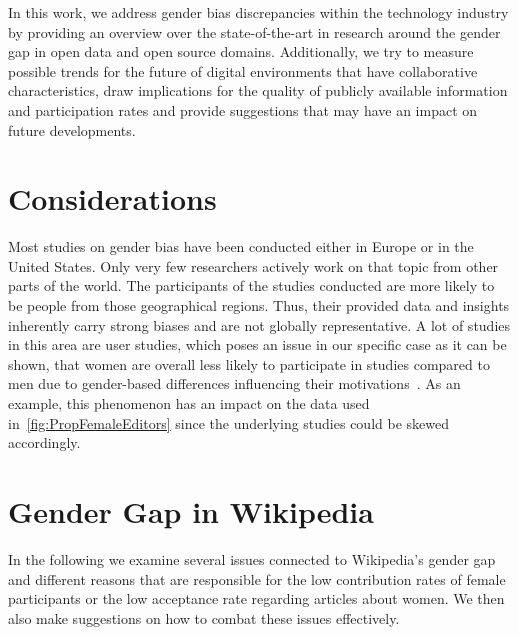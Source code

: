 \documentclass[a4paper, 11pt]{article}
\begin{document}
In this work, we address gender bias discrepancies within the technology industry by providing an overview over the state-of-the-art in research around the gender gap in open data and open source domains. Additionally, we try to measure possible trends for the future of digital environments that have collaborative characteristics, draw implications for the quality of publicly available information and participation rates and provide suggestions that may have an impact on future developments.

\section{Considerations} \label{sec:considerations}
Most studies on gender bias have been conducted either in Europe or in the United States. Only very few researchers actively work on that topic from other parts of the world. The participants of the studies conducted are more likely to be people from those geographical regions. Thus, their provided data and insights inherently carry strong biases and are not globally representative. A lot of studies in this area are user studies, which poses an issue in our specific case as it can be shown, that women are overall less likely to participate in studies compared to men due to gender-based differences influencing their motivations~\cite{lobato2014impact}. As an example, this phenomenon has an impact on the data used in~\autoref{fig:PropFemaleEditors} since the underlying studies could be skewed accordingly.

\section{Gender Gap in Wikipedia} \label{sec:gender-gap-wikipedia}
In the following we examine several issues connected to Wikipedia’s gender gap and different reasons that are responsible for the low contribution rates of female participants or the low acceptance rate regarding articles about women. We then also make suggestions on how to combat these issues effectively.
\end{document}

